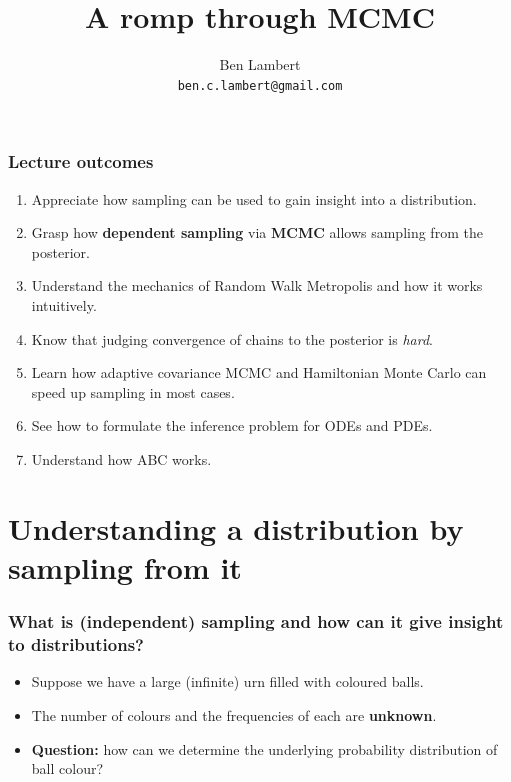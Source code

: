 \documentclass[handout]{beamer}
\title{A romp through MCMC}
\author[Ben Lambert]{Ben Lambert\inst{1}\\ \texttt{ben.c.lambert@gmail.com}}
\date{}
\institute[University of Oxford]{
	\inst{1}University of Oxford}
\begin{document}
\begin{frame}
\titlepage
\end{frame}

\begin{frame}
\frametitle{Lecture outcomes}

\begin{enumerate}
\item<2-> Appreciate how sampling can be used to gain insight into a distribution.
\item<3-> Grasp how \textbf{dependent sampling} via \textbf{MCMC} allows sampling from the posterior.
\item<4-> Understand the mechanics of Random Walk Metropolis and how it works intuitively.
\item<5-> Know that judging convergence of chains to the posterior is \textit{hard}.
\item<6-> Learn how adaptive covariance MCMC and Hamiltonian Monte Carlo can speed up sampling in most cases.
\item See how to formulate the inference problem for ODEs and PDEs.
\item Understand how ABC works.
\end{enumerate}

\end{frame}

\section{Understanding a distribution by sampling from it}
\frame{\tableofcontents[currentsection]}

\begin{frame}
\frametitle{What is (independent) sampling and how can it give insight to distributions?}
\begin{itemize}
\item<2-> Suppose we have a large (infinite) urn filled with coloured balls.
\item<3-> The number of colours and the frequencies of each are \textbf{unknown}.
\item<4-> \textbf{Question:} how can we determine the underlying probability distribution of ball colour?
\end{itemize}

\begin{figure}[t]
\centerline{}
\end{figure}

\end{frame}
\end{document}
